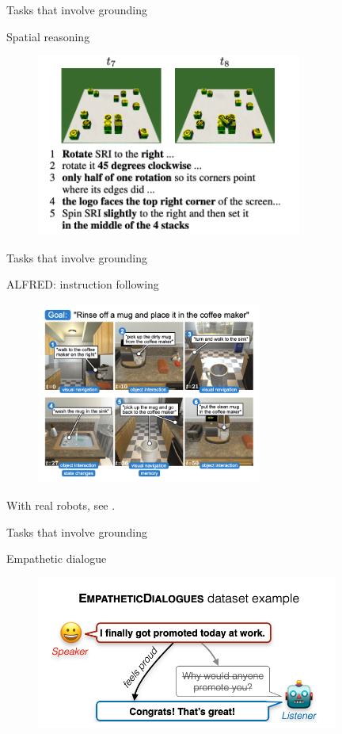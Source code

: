 \documentclass[usenames,dvipsnames,11pt,aspectratio=169]{beamer}
\begin{document}
\begin{frame}
    {Tasks that involve grounding}

    Spatial reasoning \mycite{[Bisk+ 2017]}
    \vspace{-1em}
    \begin{figure}
        \includegraphics[height=6cm]{figures/spatial}
    \end{figure}
\end{frame}

\begin{frame}
    {Tasks that involve grounding}

    ALFRED: instruction following \mycite{[Shridhar+ 2020]}
    \vspace{-1em}
    \begin{figure}
        \includegraphics[height=6cm]{figures/alfred}
    \end{figure}

    With real robots, see \mycite{[Chai+ 2018]}.
\end{frame}

\begin{frame}
    {Tasks that involve grounding}

    Empathetic dialogue \mycite{[Rashkin+ 2020]}
    \vspace{-1em}
    \begin{figure}
        \includegraphics[height=5cm]{figures/empathetic}
    \end{figure}
\end{frame}
\end{document}
